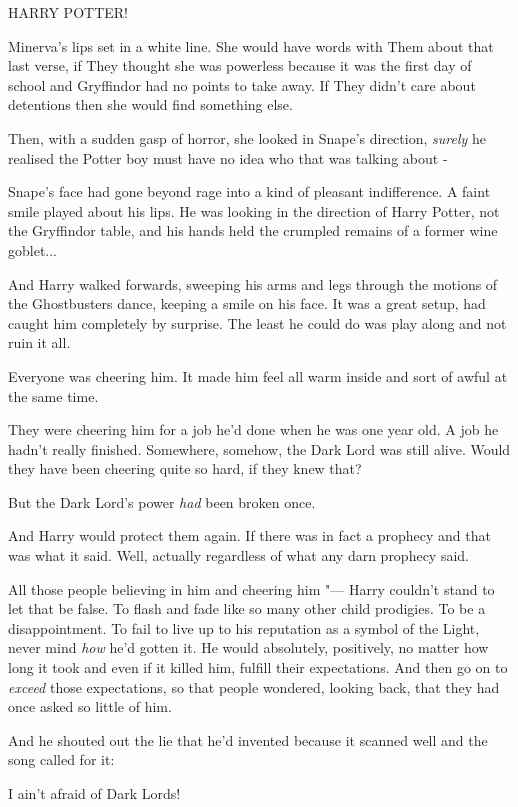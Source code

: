 HARRY POTTER!

Minerva's lips set in a white line. She would have words with Them about
that last verse, if They thought she was powerless because it was the
first day of school and Gryffindor had no points to take away. If They
didn't care about detentions then she would find something else.

Then, with a sudden gasp of horror, she looked in Snape's direction,
\emph{surely} he realised the Potter boy must have no idea who that was
talking about -

Snape's face had gone beyond rage into a kind of pleasant indifference.
A faint smile played about his lips. He was looking in the direction of
Harry Potter, not the Gryffindor table, and his hands held the crumpled
remains of a former wine goblet...

And Harry walked forwards, sweeping his arms and legs through the
motions of the Ghostbusters dance, keeping a smile on his face. It was a
great setup, had caught him completely by surprise. The least he could
do was play along and not ruin it all.

Everyone was cheering him. It made him feel all warm inside and sort of
awful at the same time.

They were cheering him for a job he'd done when he was one year old. A
job he hadn't really finished. Somewhere, somehow, the Dark Lord was
still alive. Would they have been cheering quite so hard, if they knew
that?

But the Dark Lord's power \emph{had} been broken once.

And Harry would protect them again. If there was in fact a prophecy and
that was what it said. Well, actually regardless of what any darn
prophecy said.

All those people believing in him and cheering him "--- Harry couldn't
stand to let that be false. To flash and fade like so many other child
prodigies. To be a disappointment. To fail to live up to his reputation
as a symbol of the Light, never mind \emph{how} he'd gotten it. He would
absolutely, positively, no matter how long it took and even if it killed
him, fulfill their expectations. And then go on to \emph{exceed} those
expectations, so that people wondered, looking back, that they had once
asked so little of him.

And he shouted out the lie that he'd invented because it scanned well
and the song called for it:

I ain't afraid of Dark Lords!

